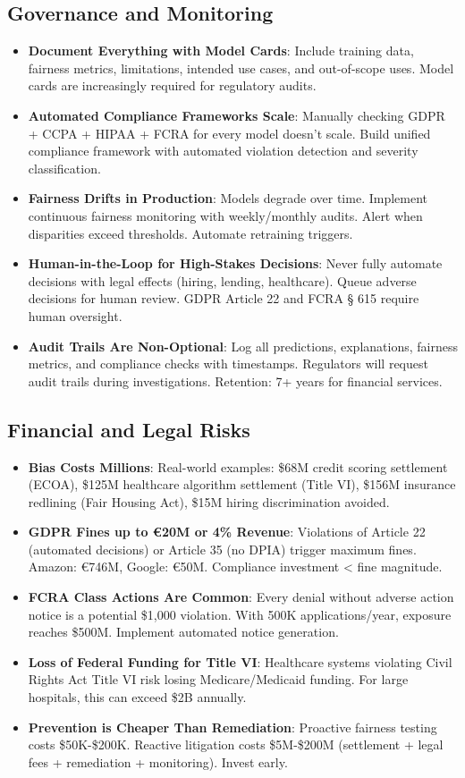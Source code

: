 \subsection{Governance and Monitoring}
\begin{itemize}
    \item \textbf{Document Everything with Model Cards}: Include training data, fairness metrics, limitations, intended use cases, and out-of-scope uses. Model cards are increasingly required for regulatory audits.
    \item \textbf{Automated Compliance Frameworks Scale}: Manually checking GDPR + CCPA + HIPAA + FCRA for every model doesn't scale. Build unified compliance framework with automated violation detection and severity classification.
    \item \textbf{Fairness Drifts in Production}: Models degrade over time. Implement continuous fairness monitoring with weekly/monthly audits. Alert when disparities exceed thresholds. Automate retraining triggers.
    \item \textbf{Human-in-the-Loop for High-Stakes Decisions}: Never fully automate decisions with legal effects (hiring, lending, healthcare). Queue adverse decisions for human review. GDPR Article 22 and FCRA § 615 require human oversight.
    \item \textbf{Audit Trails Are Non-Optional}: Log all predictions, explanations, fairness metrics, and compliance checks with timestamps. Regulators will request audit trails during investigations. Retention: 7+ years for financial services.
\end{itemize}

\subsection{Financial and Legal Risks}
\begin{itemize}
    \item \textbf{Bias Costs Millions}: Real-world examples: \$68M credit scoring settlement (ECOA), \$125M healthcare algorithm settlement (Title VI), \$156M insurance redlining (Fair Housing Act), \$15M hiring discrimination avoided.
    \item \textbf{GDPR Fines up to €20M or 4\% Revenue}: Violations of Article 22 (automated decisions) or Article 35 (no DPIA) trigger maximum fines. Amazon: €746M, Google: €50M. Compliance investment < fine magnitude.
    \item \textbf{FCRA Class Actions Are Common}: Every denial without adverse action notice is a potential \$1,000 violation. With 500K applications/year, exposure reaches \$500M. Implement automated notice generation.
    \item \textbf{Loss of Federal Funding for Title VI}: Healthcare systems violating Civil Rights Act Title VI risk losing Medicare/Medicaid funding. For large hospitals, this can exceed \$2B annually.
    \item \textbf{Prevention is Cheaper Than Remediation}: Proactive fairness testing costs \$50K-\$200K. Reactive litigation costs \$5M-\$200M (settlement + legal fees + remediation + monitoring). Invest early.
\end{itemize}

